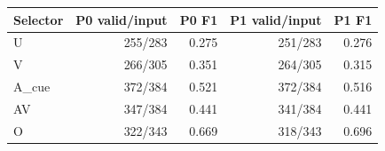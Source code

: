 \begin{tabular}{lrrrr}
\toprule Selector & P0 valid/input & P0 F1 & P1 valid/input & P1 F1 \\
\midrule
U & 255/283 & 0.275 & 251/283 & 0.276 \\
V & 266/305 & 0.351 & 264/305 & 0.315 \\
A\_cue & 372/384 & 0.521 & 372/384 & 0.516 \\
AV & 347/384 & 0.441 & 341/384 & 0.441 \\
O & 322/343 & 0.669 & 318/343 & 0.696 \\
\bottomrule
\end{tabular}
